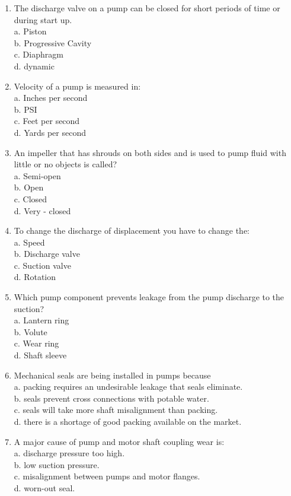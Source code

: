\begin{enumerate}[1.]
\item The discharge valve on a 	pump can be closed for short periods of time or during start up.\\
a.	Piston\\
b.	Progressive Cavity\\
c.	Diaphragm\\
d.	dynamic

\item Velocity of a pump is measured in:\\
a.	Inches per second\\
b.	PSI\\
c.	Feet per second\\
d.	Yards per second\\


\item An impeller that has shrouds on both sides and is used to pump fluid with little or no objects is called?\\
a.	Semi-open\\
b.	Open\\
c.	Closed\\
d.	Very - closed
 
\item To change the discharge of displacement you have to change the:\\
a.	Speed\\
b.	Discharge valve\\
c.	Suction valve\\
d.	Rotation

\item Which pump component prevents leakage from the pump discharge to the suction?\\
a.  Lantern ring\\
b.  Volute\\
c.  Wear ring\\
d.  Shaft sleeve

\item Mechanical seals are being installed in pumps because\\
a.	packing requires an undesirable leakage that seals eliminate.\\
b.	seals prevent cross connections with potable water.\\
c.	seals will take more shaft misalignment than packing.\\
d.	there is a shortage of good packing available on the market.\\

\item A major cause of pump and motor shaft coupling wear is:\\
a.	discharge pressure too high.\\
b.	low suction pressure.\\
c.	misalignment between pumps and motor flanges.\\
d.	worn-out seal.


\end{enumerate}
